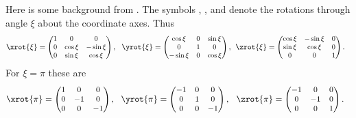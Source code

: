 \documentclass[11pt,titlepage,fleqn]{article}
\begin{document}
Here is some background from \citet{TapeTape2013}. The symbols \xrot{\xi}, \yrot{\xi}, and \zrot{\xi} denote the rotations through angle $\xi$ about the coordinate axes. Thus
%
\begin{equation*}
\xrot{\xi}=\begin{small}\begin{pmatrix}   1 &     0   & 0\\
                                          0 & \cos\xi &-\sin\xi\\
                                          0 & \sin\xi & \cos\xi\end{pmatrix}\end{small},\:\:\:
\yrot{\xi}=\begin{small}\begin{pmatrix}\cos\xi & 0 &\sin\xi \\
                                       0       & 1 & 0      \\
                                      -\sin\xi & 0 & \cos\xi\end{pmatrix}\end{small},\:\:
\zrot{\xi}=\begin{small}\begin{pmatrix}   \cos\xi & -\sin\xi & 0 \\
                                          \sin\xi & \cos\xi & 0 \\
                                          0  & 0 & 1\end{pmatrix}\end{small}.\:\:\:
\end{equation*}
%
For $\xi = \pi$ these are
%
\begin{equation*}
\xrot{\pi}=\begin{small}\begin{pmatrix}   1 &     0   & 0\\
                                          0 & -1 & 0\\
                                          0 & 0 & -1\end{pmatrix}\end{small},\:\:\:
\yrot{\pi}=\begin{small}\begin{pmatrix}-1 & 0 & 0 \\
                                       0 & 1 & 0      \\
                                       0 & 0 & -1\end{pmatrix}\end{small},\:\:\;
\zrot{\pi}=\begin{small}\begin{pmatrix}   -1 & 0 & 0 \\
                                          0 & -1 & 0 \\
                                          0  & 0 & 1\end{pmatrix}\end{small}.\:\:\:
\label{eq:DefXxiYxiZxi}
\end{equation*}
\end{document}
